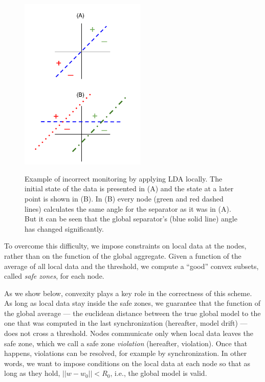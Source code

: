 \documentclass{vldb}
\begin{document}
\begin{figure}[h]
\centering
\includegraphics[width=60mm, height=9cm]{graphics/NegativeExample.png}
\caption{Example of incorrect monitoring by applying LDA locally. The
initial state of the data is presented in (A) and the state at a later point
is shown in (B). In (B) every node (green and red dashed lines) calculates the same angle
for the separator as it was in (A). But it can be
seen that the global separator's (blue solid line) angle has changed
significantly.}
\label{NegativeExample}
\end{figure}


\par To overcome this difficulty, we impose constraints on local data at the nodes, rather than on the function of the global aggregate. Given a function of the average of all local data and the threshold, we compute a ``good'' convex subsets, called \textit{safe zones}, for each node.

\par As we show below, convexity plays a key role in the correctness of this scheme. As long as local data stay inside the safe zones, we guarantee that the function of the global average ---  the euclidean distance between the true global model to the one that was computed in the last synchronization (hereafter, model drift) --- does not cross a threshold.
Nodes communicate only when local data leaves the
safe zone, which we call a safe zone \textit{violation} (hereafter,
violation). Once that happens, violations can be resolved,
for example by synchronization.
In other words, we want to impose conditions on the local
data at each node so that as long as they hold, $||w-w_0||<R_0$, i.e., the global model is valid.
\end{document}
